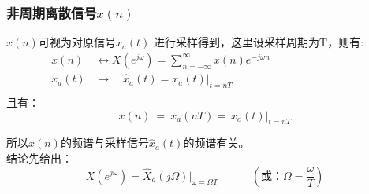 \documentclass[notheorems,compress,mathserif,table]{beamer}
\begin{document}
\begin{frame}[shrink]\frametitle{非周期离散信号$x(n)$}%

$x(n)$可视为对原信号$x_a(t)$ 进行采样得到，这里设采样周期为T，则有:
  \begin{equation*}
        \begin{split}
             x(n) \:  &\longleftrightarrow   X(e^{j\omega}) = \sum_{n=-\infty}^{\infty}x(n)e^{-j\omega n}\quad\quad\quad\quad\quad\quad\quad\quad\\
             x_a(t)   &\longrightarrow     \quad  \hat{x}_a(t) = x_a(t)|_{t=nT}\\
        \end{split}
        \end{equation*}
        且有：
$$                     x(n)\:   =\:  x_a(nT)  =\: x_a(t)|_{t=nT}$$

        所以$x(n)$的频谱与采样信号$\hat{x}_a(t)$的频谱有关。\\
        结论先给出：
        $$ X(e^{j\omega})  = \hat{X}_a(j\Omega)\big|_{\omega = \Omega T}\quad\quad\quad(\mbox{或：}\Omega = \frac{\omega}{T})$$%
\end{frame}
\end{document}
